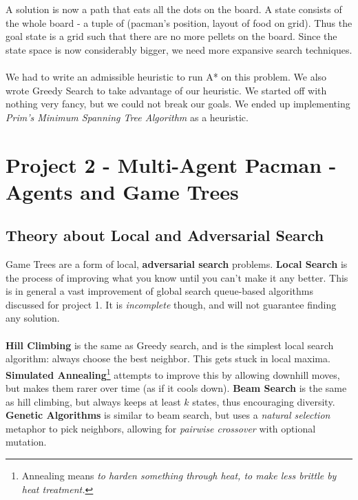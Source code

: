 \documentclass[]{article}
\begin{document}
A solution is now a path that eats all the dots on the board. A state consists of the whole board - a tuple of (pacman's position, layout of food on grid). Thus the goal state is a grid such that there are no more pellets on the board. Since the state space is now considerably bigger, we need more expansive search techniques.

\paragraph{}

We had to write an admissible heuristic to run A* on this problem. We also wrote Greedy Search to take advantage of our heuristic. We started off with nothing very fancy, but we could not break our goals. We ended up implementing \emph{Prim's Minimum Spanning Tree Algorithm} as a heuristic.

\pagebreak

\section{Project 2 - Multi-Agent Pacman - Agents and Game Trees}\label{P2}

\subsection{Theory about Local and Adversarial Search}

Game Trees are a form of local, \textbf{adversarial search} problems.
\textbf{Local Search} is the process of improving what you know until you can't make it any better. This is in general a vast improvement of global search queue-based algorithms discussed for project 1. It is \emph{incomplete} though, and will not guarantee finding any solution.

\paragraph{}

\textbf{Hill Climbing} is the same as Greedy search, and is the simplest local search algorithm: always choose the best neighbor. This gets stuck in local maxima. \textbf{Simulated Annealing}\footnote{Annealing means \emph{to harden something through heat, to make less brittle by heat treatment.}} attempts to improve this by allowing downhill moves, but makes them rarer over time (as if it cools down). \textbf{Beam Search} is the same as hill climbing, but always keeps at least $k$ states, thus encouraging diversity. \textbf{Genetic Algorithms} is similar to beam search, but uses a \emph{natural selection} metaphor to pick neighbors, allowing for \emph{pairwise crossover} with optional mutation.
\end{document}
